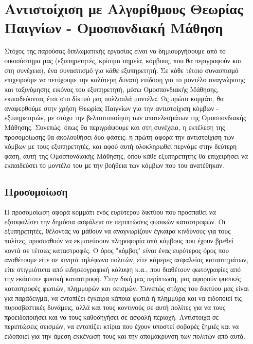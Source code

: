 \chapter{Αντιστοίχιση με Αλγορίθμους Θεωρίας Παιγνίων - Ομοσπονδιακή Μάθηση}

Στόχος της παρούσας διπλωματικής εργασίας είναι να δημιουργήσουμε από το οικοσύστημα μας (εξυπηρετητές, κρίσιμα σημεία, κόμβους, που θα περιγραφούν και στη συνέχεια), ένα συνασπισμό για κάθε εξυπηρετητή. Σε κάθε τέτοιο συνασπισμό επιχειρούμε να πετύχουμε την καλύτερη δυνατή επίδοση για το μοντέλο αναγνώρισης και ταξινόμησης εικόνας του εξυπηρετητή, μέσω Ομοσπονδιακής Μάθησης, εκπαιδεύοντας έτσι στο δίκτυό μας πολλαπλά μοντέλα. Ως πρώτο κομμάτι, θα αναφερθούμε στην χρήση Θεωρίας Παιγνίων για την αντιστοίχιση κόμβων - εξυπηρετητών, με στόχο την βελτιστοποίηση των αποτελεσμάτων της Ομοσπονδιακής Μάθησης. Συνεπώς, όπως θα περιγράψουμε και στη συνέχεια, η εκτέλεση της προσομοίωσης θα ακολουθήσει δύο φάσεις: η πρώτη αφορά την αντιστοίχιση των κόμβων με τους εξυπηρετητές, και αφού αυτή ολοκληρωθεί περνάμε στην δεύτερη φάση, αυτή της Ομοσπονδιακής Μάθησης, όπου κάθε εξυπηρετητής θα επιχειρήσει να εκπαιδεύσει το μοντέλο του με την βοήθεια των κόμβων που του ανατέθηκαν.

\section{Προσομοίωση}

Η προσομοίωση αφορά κομμάτι ενός ευρύτερου δικτύου που προσπαθεί να εξασφαλίσει την δημόσια ασφάλεια σε περιπτώσεις φυσικών καταστροφών. Οι εξυπηρετητές, θέλοντας να μάθουν να αναγνωρίζουν έγκαιρα κινδύνους για τους πολίτες, προσπαθούν να εκμαιεύσουν πληροφορία από κόμβους που έχουν βρεθεί κοντά σε τέτοιες καταστροφές. Ο όρος "κόμβος" είναι ένας ευρύτερος όρος που αναθέτουμε είτε σε κινητά τηλέφωνα πολιτών, είτε κάμερες ασφαλείας καταστημάτων, είτε στιγμιότυπα από ειδησεογραφική κάλυψη κ.α., που διαθέτουν φωτογραφίες από την εκάστοτε φυσική καταστροφή. Στην δική μας περίπτωση, μας αφορούν φυσικές καταστροφές φωτιών, πλημμυρών και σεισμών. Συνεπώς στόχος του δικτύου μας είναι για παράδειγμα, να εντοπίζει έγκαιρα κάποια φωτιά ή πλημμύρα και να ειδοποιεί τις πυροσβεστικές δυνάμεις, αλλά και τους κοντινούς σε αυτή πολίτες για να τους προειδοποιήσει και να τους καθοδηγήσει σε ασφαλή περιοχή. Αντίστοιχα σε περιπτώσεις σεισμών, να εντοπίζει κτίρια που έχουν υποστεί σοβαρές ζημιές και να ειδοποιεί για την άμεση εκκένωσή τους και την απομάκρυνση των πολιτών από αυτά. 

